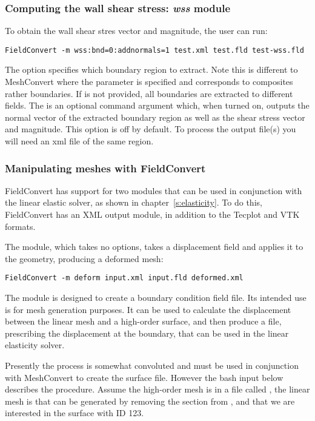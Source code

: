 \subsubsection{Computing the wall shear stress: \textit{wss} module}
To obtain the wall shear stres vector and magnitude, the user can run:
\begin{lstlisting}[style=BashInputStyle] 
FieldConvert -m wss:bnd=0:addnormals=1 test.xml test.fld test-wss.fld
\end{lstlisting}
The option  specifies which boundary region to extract. Note this is different to MeshConvert where the parameter  is specified and corresponds to composites rather boundaries. If  is not provided, all boundaries are extracted to different fields. The  is an optional command argument which, when turned on, outputs the normal vector of the extracted boundary region as well as the shear stress vector and magnitude. This option is off by default. To process the output file(s) you will need an xml file of the same region. 
%
%
%

\subsubsection{Manipulating meshes with FieldConvert}
FieldConvert has support for two modules that can be used in conjunction with
the linear elastic solver, as shown in chapter~\ref{s:elasticity}. To do this,
FieldConvert has an XML output module, in addition to the Tecplot and VTK
formats.

The  module, which takes no options, takes a displacement field
and applies it to the geometry, producing a deformed mesh:
\begin{lstlisting}[style=BashInputStyle]
FieldConvert -m deform input.xml input.fld deformed.xml
\end{lstlisting}

The  module is designed to create a boundary condition field
file. Its intended use is for mesh generation purposes. It can be used to
calculate the displacement between the linear mesh and a high-order surface, and
then produce a  file, prescribing the displacement at the boundary,
that can be used in the linear elasticity solver.

Presently the process is somewhat convoluted and must be used in conjunction
with MeshConvert to create the surface file. However the bash input below
describes the procedure. Assume the high-order mesh is in a file called
, the linear mesh is  that can be
generated by removing the  section from , and that
we are interested in the surface with ID 123.

